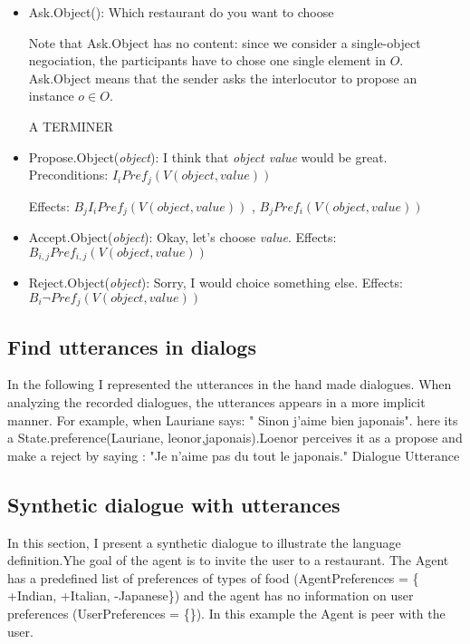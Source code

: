 \documentclass{llncs}
\begin{document}
\begin{itemize}
  \item Ask.Object(): Which restaurant do you want to choose
  
	 Note that Ask.Object has no content: since we consider a single-object negociation, the participants have to chose one single element in $O$. Ask.Object means that the sender
	 asks the interlocutor to propose an instance $o\in O$.
	 
	 A TERMINER
 
  \item Propose.Object(\textit{object}): I think that \textit{object value} would be great.
  \subitem Preconditions:  $ I_{i} Pref_{j}(V(object, value))$
  
  \subitem Effects:  $B_{j} I_{i} Pref_{j}(V(object, value))$ ,  $ B_{j} Pref_{i}(V(object, value))$  
  \item Accept.Object(\textit{object}): Okay, let's choose \textit{value}.
     \subitem Effects:  $B_{i,j} Pref_{i,j}(V(object, value))$ 
  
  \item Reject.Object(\textit{object}): Sorry, I would choice something else.
      \subitem Effects:  $B_{i} \neg  Pref_{j}(V(object, value))$
 \end{itemize} 
 \subsection{Find utterances in dialogs}	
 
 In the following I represented the utterances in the hand made dialogues. When analyzing the recorded dialogues, the utterances appears in a more implicit manner. For example, when Lauriane says: " Sinon j'aime bien japonais". here its a State.preference(Lauriane, leonor,japonais).Loenor perceives it as a propose and make a reject by saying : "Je n'aime pas du tout le japonais."
 Dialogue	Utterance

 \subsection{Synthetic dialogue with utterances}
 In this section, I present a synthetic dialogue to illustrate the language definition.Yhe goal of the agent is to invite the user to a restaurant. The Agent has a predefined list of preferences of types of food (AgentPreferences = \{ +Indian, +Italian, -Japanese\}) and the agent has no information on user preferences (UserPreferences = \{\}). In this example the Agent is peer with the user. 


\begin{minipage}{0.45\textwidth}
 
\end{minipage}%
\hfill
\begin{minipage}{0.45\textwidth}

\end{minipage}%


\noindent 
\vskip 4pt


\end{document}
